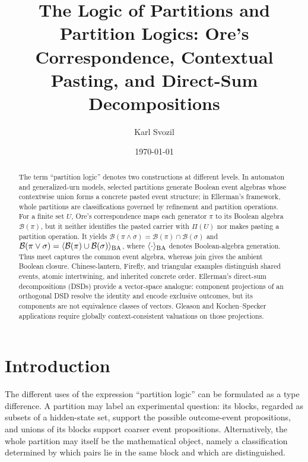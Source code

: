 \documentclass[aps,pra,reprint,nofootinbib]{revtex4-2}
\newcommand{\Part}{\Pi}
\newcommand{\BA}{\mathcal{B}}
\begin{document}
\title{The Logic of Partitions and Partition Logics: Ore's Correspondence, Contextual Pasting, and Direct-Sum Decompositions}

\author{Karl Svozil}
\date{\today}

\begin{abstract}
The term ``partition logic'' denotes two constructions at different levels.
In automaton and generalized-urn models, selected partitions generate Boolean
event algebras whose contextwise union forms a concrete pasted event structure;
in Ellerman's framework, whole partitions are classifications governed by
refinement and partition operations.  For a finite set $U$, Ore's
correspondence maps each generator $\pi$ to its Boolean algebra $\BA(\pi)$, but
it neither identifies the pasted carrier with $\Part(U)$ nor makes pasting a
partition operation.  It yields
$\BA(\pi\wedge\sigma)=\BA(\pi)\cap\BA(\sigma)$ and
$\BA(\pi\vee\sigma)=\langle\BA(\pi)\cup\BA(\sigma)\rangle_{\rm BA}$, where
$\langle\cdot\rangle_{\rm BA}$ denotes Boolean-algebra generation.  Thus meet
captures the common event algebra, whereas join gives the ambient Boolean
closure.  Chinese-lantern, Firefly, and triangular examples distinguish shared
events, atomic intertwining, and inherited concrete order.  Ellerman's
direct-sum decompositions (DSDs) provide a vector-space analogue: component
projections of an orthogonal DSD resolve the identity and encode exclusive
outcomes, but its components are not equivalence classes of vectors.  Gleason
and Kochen--Specker applications require globally context-consistent valuations
on those projections.
\end{abstract}

\maketitle

\section{Introduction}

The different uses of the expression ``partition logic'' can be formulated as
a type difference.  A partition may label an experimental question: its
blocks, regarded as subsets of a hidden-state set, support the possible
outcome-event propositions, and unions of its blocks support coarser event
propositions.  Alternatively, the whole partition may itself be the
mathematical object, namely a classification determined by which pairs lie in
the same block and which are distinguished.
\end{document}
